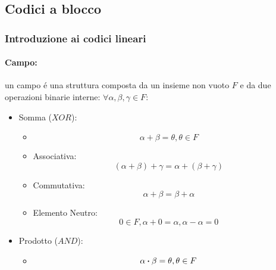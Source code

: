        \subsection{Codici a blocco}
        \subsubsection{Introduzione ai codici lineari}
            \paragraph{Campo:} un campo é una struttura composta da un insieme non vuoto $F$ e da due operazioni binarie interne: $\forall \alpha,\beta,\gamma \in F$:
                \begin{itemize}
                    \item {
                        Somma ($XOR$):
                        \begin{itemize}
                            \item {
                                \[
                                    \alpha + \beta = \theta, \theta \in F  
                                \]
                            }
                            \item {Associativa:
                                \[
                                    (\alpha + \beta) + \gamma = \alpha +( \beta + \gamma)
                                \]
                            }
                            \item {Commutativa:
                                \[
                                    \alpha + \beta = \beta + \alpha
                                \]
                            }
                            \item {Elemento Neutro:
                                \[
                                    0\in F,\alpha + 0 = \alpha,\alpha-\alpha = 0
                                \]
                            }
                        \end{itemize}
                    }
                    \item {
                        Prodotto ($AND$):   
                        \begin{itemize}
                            \item {
                                \[
                                    \alpha \dotproduct \beta = \theta, \theta \in F  
                                \]
                            }

\end{itemize}}
\end{itemize}
